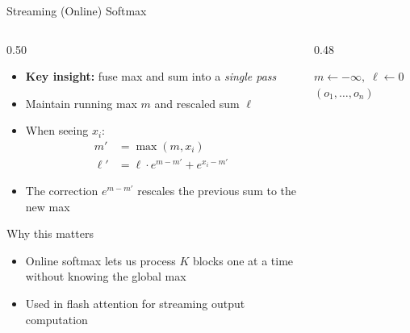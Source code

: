 \begin{frame}{Streaming (Online) Softmax}
  \begin{columns}[T]
    \begin{column}{0.50\textwidth}
      \begin{itemize}
        \item \textbf{Key insight:} fuse max and sum into a \emph{single pass}
        \item Maintain running max $m$ and rescaled sum $\ell$
        \item When seeing $x_i$:
          \vspace{-0.3em}
          \begin{align*}
            m' &= \max(m, x_i) \\
            \ell' &= \ell \cdot e^{m - m'} + e^{x_i - m'}
          \end{align*}
          \vspace{-0.5em}
        \item The correction $e^{m - m'}$ rescales the previous sum to the new max
      \end{itemize}

      \vspace{0.5em}
      \begin{block}{\small Why this matters}
        {\small 
        \begin{itemize}
        \item Online softmax lets us process $K$ blocks one at a time without knowing the global max
        \item Used in flash attention for streaming output computation
\end{itemize}}
      \end{block}
    \end{column}
    \begin{column}{0.48\textwidth}
      {\small
      \begin{algorithm}[H]
        \caption{\small Online Softmax}
        $m \gets -\infty, \; \ell \gets 0$\;
        \Return $(o_1, \ldots, o_n)$\;
      \end{algorithm}
      }


\end{column}
\end{columns}
\end{frame}
